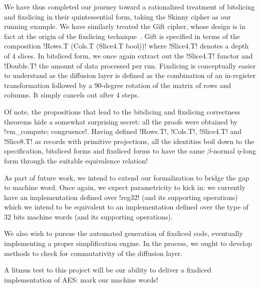 \documentclass[draft,english]{jflart}
\begin{document}
We have thus completed our journey toward a rationalized treatment of
bitslicing and fixslicing in their quintessential form, taking the
Skinny cipher as our running example.
%
%
We have similarly treated the Gift cipher, whose design is in fact at
the origin of the fixslicing technique~\citep{adomi}. Gift is
specified in terms of the composition
%
\coqe!Rows.T (Cols.T (Slice4.T bool))!
%
where \coqe!Slice4.T! denotes a depth of 4 slices. In bitsliced form,
we once again extract out the \coqe!Slice4.T! functor and
\coqe!Double.T! the amount of data processed per run. Fixslicing is
conceptually easier to understand as the diffusion layer is defined as
the combination of an in-register transformation followed by a
90-degree rotation of the matrix of rows and columns. It simply
cancels out after 4 steps.


Of note, the propositions that lead to the bitslicing and fixslicing
correctness theorems hide a somewhat surprising secret: all the proofs
were obtained by \coqe!vm_compute; congruence!. Having defined
\coqe!Rows.T!, \coqe!Cols.T!, \coqe!Slice4.T! and \coqe!Slice8.T! as
records with primitive projections, all the identities boil down to
the specification, bitsliced forms and fixsliced forms to have the
same $\beta$-normal $\eta$-long form through the suitable equivalence
relation!



As part of future work, we intend to extend our formalization to
bridge the gap to machine word. Once again, we expect parametricity to
kick in: we currently have an implementation defined over \coqe!reg32!
(and its supporting operations) which we intend to be equivalent to an
implementation defined over the type of 32 bits machine words (and its
supporting operations).

We also wish to pursue the automated generation of fixsliced code,
eventually implementing a proper simplification engine. In the
process, we ought to develop methods to check for commutativity of the
diffusion layer.

A litmus test to this project will be our ability to deliver a
fixsliced implementation of AES: mark our machine words!



\end{document}
